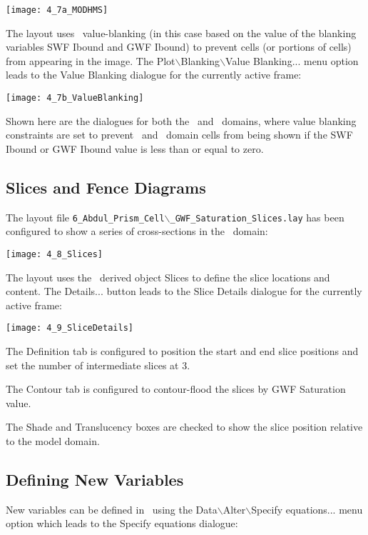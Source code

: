         \texttt{[image: 4\_7a\_MODHMS]}

 The layout uses \tecplot\ value-blanking  (in this case based on the value of the blanking variables {\sf SWF Ibound} and {\sf GWF Ibound}) to prevent cells (or portions of cells) from appearing in the image.  The {\sf Plot$\backslash$Blanking$\backslash$Value Blanking...} menu option leads to the {\sf Value Blanking} dialogue for the currently active frame:

        \texttt{[image: 4\_7b\_ValueBlanking]}

Shown here are the dialogues for both the \swf\ and \gwf\ domains, where value blanking constraints are set to prevent \swf\ and \gwf\ domain cells from being shown if the {\sf SWF Ibound} or {\sf GWF Ibound} value is less than or equal to zero.

\subsection{Slices and Fence Diagrams}
The layout file {\tt 6\_Abdul\_Prism\_Cell$\backslash$\_GWF\_Saturation\_Slices.lay} has been configured to show a series of cross-sections in the \gwf\ domain:

        \texttt{[image: 4\_8\_Slices]}

The layout uses the \tecplot\ derived object {\sf Slices} to define the slice locations and content. The {\sf Details...} button leads to the {\sf Slice Details} dialogue for the currently active frame:

        \texttt{[image: 4\_9\_SliceDetails]}

The {\sf Definition} tab is configured to position the start and end slice positions and set the number of intermediate slices at 3.

The {\sf Contour} tab is configured to contour-flood the slices by {\sf GWF Saturation} value.

The {\sf Shade} and {\sf Translucency} boxes are checked to show the slice position relative to the model domain.

\subsection{Defining New Variables}
New variables can be defined in \tecplot\ using the {\sf Data$\backslash$Alter$\backslash$Specify equations...} menu option which leads to the {\sf Specify equations} dialogue:

